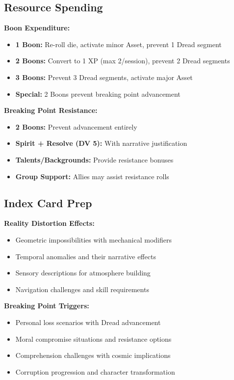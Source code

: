 \documentclass[11pt]{article}
\begin{document}
\subsection{Resource Spending}

\textbf{Boon Expenditure:}
\begin{itemize}
\item \textbf{1 Boon:} Re-roll die, activate minor Asset, prevent 1 Dread segment
\item \textbf{2 Boons:} Convert to 1 XP (max 2/session), prevent 2 Dread segments
\item \textbf{3 Boons:} Prevent 3 Dread segments, activate major Asset
\item \textbf{Special:} 2 Boons prevent breaking point advancement
\end{itemize}

\textbf{Breaking Point Resistance:}
\begin{itemize}
\item \textbf{2 Boons:} Prevent advancement entirely
\item \textbf{Spirit + Resolve (DV 5):} With narrative justification
\item \textbf{Talents/Backgrounds:} Provide resistance bonuses
\item \textbf{Group Support:} Allies may assist resistance rolls
\end{itemize}

\subsection{Index Card Prep}

\textbf{Reality Distortion Effects:}
\begin{itemize}
\item Geometric impossibilities with mechanical modifiers
\item Temporal anomalies and their narrative effects
\item Sensory descriptions for atmosphere building
\item Navigation challenges and skill requirements
\end{itemize}

\textbf{Breaking Point Triggers:}
\begin{itemize}
\item Personal loss scenarios with Dread advancement
\item Moral compromise situations and resistance options
\item Comprehension challenges with cosmic implications
\item Corruption progression and character transformation
\end{itemize}
\end{document}
